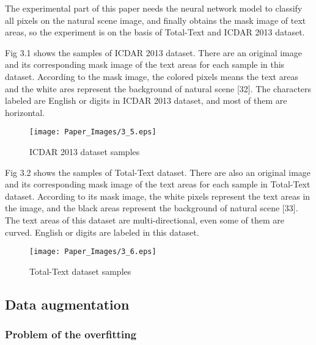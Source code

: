 \documentclass[22pt, UTF8]{article}
\numberwithin{figure}{section}
\numberwithin{table}{section}
\numberwithin{equation}{section} %
\begin{document}
\setlength\parindent{2em} The experimental part of this paper needs the neural network model to classify all pixels on the natural scene image, and finally obtains the mask image of text areas, so the experiment is on the basis of Total-Text and ICDAR 2013 dataset.

\setlength\parindent{2em} Fig 3.1 shows the samples of ICDAR 2013 dataset. There are an original image and its corresponding mask image of the text areas for each sample in this dataset. According to the mask image, the colored pixels means the text areas and the white ares represent the background of natural scene [32]. The characters labeled are English or digits in ICDAR 2013 dataset, and most of them are horizontal.

\begin{figure}[H]
    \centering
    \texttt{[image: Paper\_Images/3\_5.eps]}
    \vspace{-3mm} %
    \caption{ICDAR 2013 dataset samples}
    \vspace{-4mm} %
\end{figure}

\setlength\parindent{2em} Fig 3.2 shows the samples of Total-Text dataset. There are also an original image and its corresponding mask image of the text areas for each sample in Total-Text dataset. According to its mask image, the white pixels represent the text areas in the image, and the black areas represent the background of natural scene [33]. The text areas of this dataset are multi-directional, even some of them are curved. English or digits are labeled in this dataset.

\begin{figure}[H]
    \centering
    \texttt{[image: Paper\_Images/3\_6.eps]}
    \vspace{-3mm} %
    \caption{Total-Text dataset samples}
    \vspace{-4mm} %
\end{figure}

\subsection{Data augmentation}

\subsubsection{Problem of the overfitting}
\end{document}
